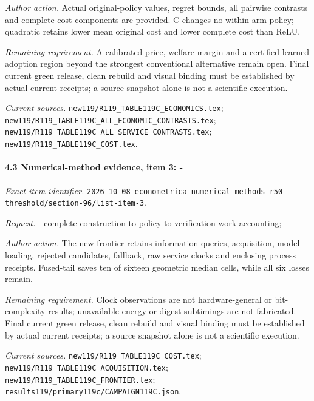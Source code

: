 \par\emph{Author action.} Actual original-policy values, regret bounds, all pairwise contrasts and complete cost components are provided. C changes no within-arm policy; quadratic retains lower mean original cost and lower complete cost than ReLU.

\par\emph{Remaining requirement.} A calibrated price, welfare margin and a certified learned adoption region beyond the strongest conventional alternative remain open. Final current green release, clean rebuild and visual binding must be established by actual current receipts; a source snapshot alone is not a scientific execution.

\par\emph{Current sources.} \nolinkurl{new119/R119_TABLE119C_ECONOMICS.tex}; \nolinkurl{new119/R119_TABLE119C_ALL_ECONOMIC_CONTRASTS.tex}; \nolinkurl{new119/R119_TABLE119C_ALL_SERVICE_CONTRASTS.tex}; \nolinkurl{new119/R119_TABLE119C_COST.tex}.

\paragraph{4.3 Numerical-method evidence, item 3: -}

\emph{Exact item identifier.} \nolinkurl{2026-10-08-econometrica-numerical-methods-r50-threshold/section-96/list-item-3}.

\par\emph{Request.} - complete construction-to-policy-to-verification work accounting;

\par\emph{Author action.} The new frontier retains information queries, acquisition, model loading, rejected candidates, fallback, raw service clocks and enclosing process receipts. Fused-tail saves ten of sixteen geometric median cells, while all six losses remain.

\par\emph{Remaining requirement.} Clock observations are not hardware-general or bit-complexity results; unavailable energy or digest subtimings are not fabricated. Final current green release, clean rebuild and visual binding must be established by actual current receipts; a source snapshot alone is not a scientific execution.

\par\emph{Current sources.} \nolinkurl{new119/R119_TABLE119C_COST.tex}; \nolinkurl{new119/R119_TABLE119C_ACQUISITION.tex}; \nolinkurl{new119/R119_TABLE119C_FRONTIER.tex}; \nolinkurl{results119/primary119c/CAMPAIGN119C.json}.

